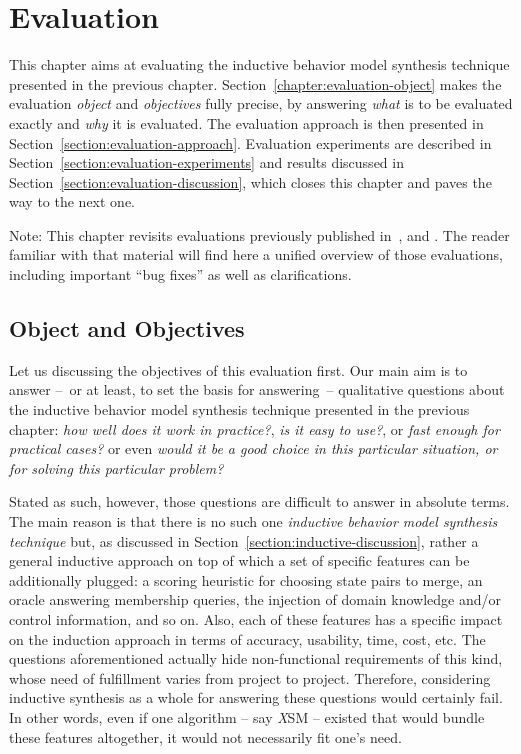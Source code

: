 \chapter{Evaluation\label{chapter:evaluation}}

This chapter aims at evaluating the inductive behavior model synthesis technique presented in the previous chapter. Section~\ref{chapter:evaluation-object} makes the evaluation \emph{object} and \emph{objectives} fully precise, by answering \emph{what} is to be evaluated exactly and \emph{why} it is evaluated. The evaluation approach is then presented in Section~\ref{section:evaluation-approach}. Evaluation experiments are described in Section~\ref{section:evaluation-experiments} and results discussed in Section~\ref{section:evaluation-discussion}, which closes this chapter and paves the way to the next one.

Note: This chapter revisits evaluations previously published in~\cite{Damas:2006}, \cite{Dupont:2008} and \cite{Lambeau:2008}. The reader familiar with that material will find here a unified overview of those evaluations, including important ``bug fixes'' as well as clarifications.

\section{Object and Objectives\label{chapter:evaluation-object}}

Let us discussing the objectives of this evaluation first. Our main aim is to answer --~or at least, to set the basis for answering~-- qualitative questions about the inductive behavior model synthesis technique presented in the previous chapter: \emph{how well does it work in practice?}, \emph{is it easy to use?}, or \emph{fast enough for practical cases?} or even \emph{would it be a good choice in this particular situation, or for solving this particular problem?}

Stated as such, however, those questions are difficult to answer in absolute terms. The main reason is that there is no such one \emph{inductive behavior model synthesis technique} but, as discussed in Section~\ref{section:inductive-discussion}, rather a general inductive approach on top of which a set of specific features can be additionally plugged: a scoring heuristic for choosing state pairs to merge, an oracle answering membership queries, the injection of domain knowledge and/or control information, and so on. Also, each of these features has a specific impact on the induction approach in terms of accuracy, usability, time, cost, etc. The questions aforementioned actually hide non-functional requirements of this kind, whose need of fulfillment varies from project to project. Therefore, considering inductive synthesis as a whole for answering these questions would certainly fail. In other words, even if one algorithm -- say \emph{X}SM -- existed that would bundle these features altogether, it would not necessarily fit one's need.

